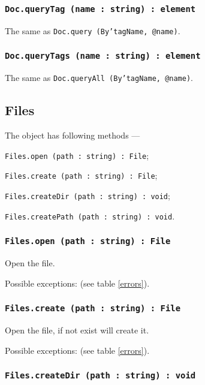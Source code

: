 \subsubsection{\texttt{Doc.queryTag (name : string) : element}}

The same as \texttt{Doc.query (By'tagName, @name)}.

\subsubsection{\texttt{Doc.queryTags (name : string) : element}}

The same as \texttt{Doc.queryAll (By'tagName, @name)}.

\subsection{Files}

The object \files{} has following methods —
\begin{icItems}
	\item \texttt{Files.open (path : string) : File};
	\item \texttt{Files.create (path : string) : File};
	\item \texttt{Files.createDir (path : string) : void};
	\item \texttt{Files.createPath (path : string) : void}.
\end{icItems}

\subsubsection{\texttt{Files.open (path : string) : File}}

Open the file.

Possible exceptions:  (see table \ref{errors}).

\subsubsection{\texttt{Files.create (path : string) : File}}

Open the file, if not exist will create it.

Possible exceptions:  (see table \ref{errors}).

\subsubsection{\texttt{Files.createDir (path : string) : void}}

